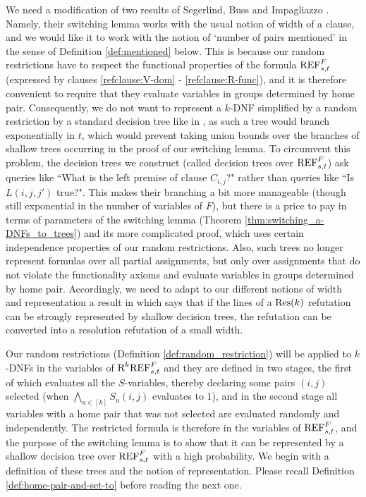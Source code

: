 \documentclass[10pt,a4paper]{article}
\theoremstyle{remark}
\newtheorem*{switching lemma}{Switching Lemma}
\newtheorem*{open problem}{Open Problem}
\theoremstyle{definition}
\begin{document}
We need a modification of two results of Segerlind, Buss and Impagliazzo \cite{segerlind-buss-impagliazzo}. Namely, their switching lemma works with the usual notion of width of a clause, and we would like it to work with the notion of `number of pairs mentioned' in the sense of Definition \ref{def:mentioned} below. This is because our random restrictions have to respect the functional properties of the formula $\textnormal{REF}^F_{s,t}$ (expressed by clauses \eqref{refclause:V-dom} - \eqref{refclause:R-func}), and it is therefore convenient to require that they evaluate variables in groups determined by home pair. Consequently, we do not want to represent a $k$-DNF simplified by a random restriction by a standard decision tree like in \cite{segerlind-buss-impagliazzo}, as such a tree would branch exponentially in $t$, which would prevent taking union bounds over the branches of shallow trees occurring in the proof of our switching lemma. To circumvent this problem, the decision trees we construct (called decision trees over $\textnormal{REF}^F_{s,t}$) ask queries like ``What is the left premise of clause $C_{i,j}$?" rather than queries like ``Is $L(i,j,j')$ true?". This makes their branching a bit more manageable (though still exponential in the number of variables of $F$), but there is a price to pay in terms of parameters of the switching lemma (Theorem \ref{thm:switching_a-DNFs_to_trees}) and its more complicated proof, which uses certain independence properties of our random restrictions. Also, such trees no longer represent formulas over all partial assignments, but only over assignments that do not violate the functionality axioms and evaluate variables in groups determined by home pair. Accordingly, we need to adapt to our different notions of width and representation a result in \cite{segerlind-buss-impagliazzo} which says that if the lines of a $\textnormal{Res}(k)$ refutation can be strongly represented by shallow decision trees, the refutation can be converted into a resolution refutation of a small width.

Our random restrictions (Definition \ref{def:random_restriction}) will be applied to $k$-DNFs in the variables of $\textnormal{R}^k\textnormal{REF}^F_{s,t}$ and they are defined in two stages, the first of which evaluates all the $S$-variables, thereby declaring some pairs $(i,j)$ selected (when $\bigwedge_{u \in [k]}S_u(i,j)$ evaluates to 1), and in the second stage all variables with a home pair that was not selected are evaluated randomly and independently. The restricted formula is therefore in the variables of $\textnormal{REF}^F_{s,t}$, and the purpose of the switching lemma is to show that it can be represented by a shallow decision tree over $\textnormal{REF}^F_{s,t}$ with a high probability. We begin with a definition of these trees and the notion of representation.
Please recall Definition \ref{def:home-pair-and-set-to} before reading the next one.
\end{document}
